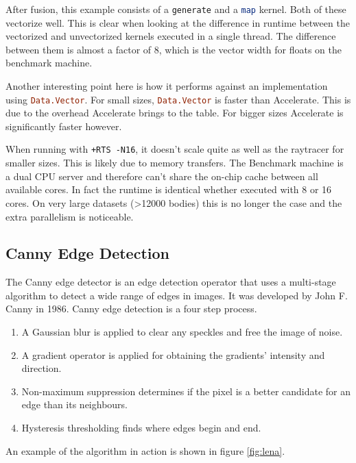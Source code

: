 \documentclass[a4paper,bibliography=totocnumbered,parskip,headsepline]{scrbook}
\begin{document}
After fusion, this example consists of a \lstinline[language=haskell]!generate! and a \lstinline[language=haskell]!map! kernel.
Both of these vectorize well.
This is clear when looking at the difference in runtime between the vectorized and unvectorized kernels executed in a single thread.
The difference between them is almost a factor of 8, which is the vector width for floats on the benchmark machine.

Another interesting point here is how it performs against an implementation using \lstinline[language=haskell]!Data.Vector!.
For small sizes, \lstinline[language=haskell]!Data.Vector! is faster than Accelerate.
This is due to the overhead Accelerate brings to the table.
For bigger sizes Accelerate is significantly faster however.

When running with \texttt{+RTS -N16}, it doesn't scale quite as well as the raytracer for smaller sizes.
This is likely due to memory transfers.
The Benchmark machine is a dual CPU server and therefore can't share the on-chip cache between all available cores.
In fact the runtime is identical whether executed with 8 or 16 cores.
On very large datasets (>12000 bodies) this is no longer the case and the extra parallelism is noticeable.

\subsection{Canny Edge Detection}
The Canny edge detector is an edge detection operator that uses a multi-stage algorithm to detect a wide range of edges in images.
It was developed by John F. Canny in 1986.
Canny edge detection is a four step process.
\begin{enumerate}
\item A Gaussian blur is applied to clear any speckles and free the image of noise.
\item A gradient operator is applied for obtaining the gradients' intensity and direction.
\item Non-maximum suppression determines if the pixel is a better candidate for an edge than its neighbours.
\item Hysteresis thresholding finds where edges begin and end.
\end{enumerate}

An example of the algorithm in action is shown in figure \ref{fig:lena}.
\end{document}
